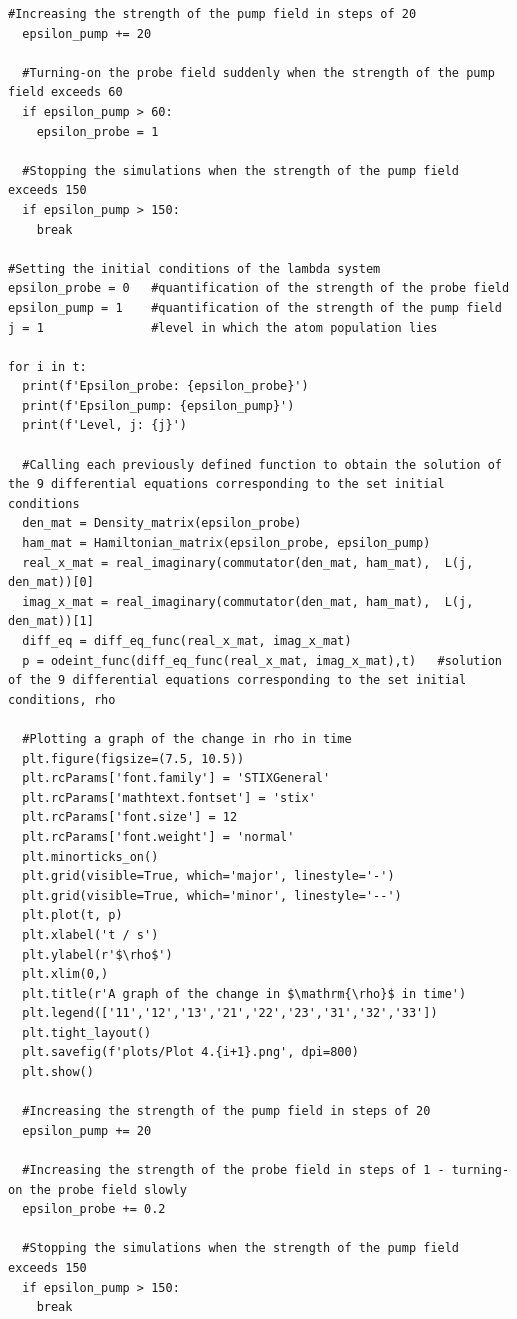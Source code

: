 \documentclass[12pt, a4paper]{article}
\begin{document}
\begin{lstlisting}[language=iPython]
  #Increasing the strength of the pump field in steps of 20
  epsilon_pump += 20

  #Turning-on the probe field suddenly when the strength of the pump field exceeds 60
  if epsilon_pump > 60:
    epsilon_probe = 1

  #Stopping the simulations when the strength of the pump field exceeds 150
  if epsilon_pump > 150:
    break

#Setting the initial conditions of the lambda system
epsilon_probe = 0   #quantification of the strength of the probe field
epsilon_pump = 1    #quantification of the strength of the pump field
j = 1               #level in which the atom population lies

for i in t:
  print(f'Epsilon_probe: {epsilon_probe}')
  print(f'Epsilon_pump: {epsilon_pump}')
  print(f'Level, j: {j}')

  #Calling each previously defined function to obtain the solution of the 9 differential equations corresponding to the set initial conditions
  den_mat = Density_matrix(epsilon_probe)
  ham_mat = Hamiltonian_matrix(epsilon_probe, epsilon_pump)
  real_x_mat = real_imaginary(commutator(den_mat, ham_mat),  L(j, den_mat))[0]
  imag_x_mat = real_imaginary(commutator(den_mat, ham_mat),  L(j, den_mat))[1]
  diff_eq = diff_eq_func(real_x_mat, imag_x_mat)
  p = odeint_func(diff_eq_func(real_x_mat, imag_x_mat),t)   #solution of the 9 differential equations corresponding to the set initial conditions, rho

  #Plotting a graph of the change in rho in time
  plt.figure(figsize=(7.5, 10.5))
  plt.rcParams['font.family'] = 'STIXGeneral'
  plt.rcParams['mathtext.fontset'] = 'stix'
  plt.rcParams['font.size'] = 12
  plt.rcParams['font.weight'] = 'normal'
  plt.minorticks_on()
  plt.grid(visible=True, which='major', linestyle='-')
  plt.grid(visible=True, which='minor', linestyle='--')
  plt.plot(t, p)
  plt.xlabel('t / s')
  plt.ylabel(r'$\rho$')
  plt.xlim(0,)
  plt.title(r'A graph of the change in $\mathrm{\rho}$ in time')
  plt.legend(['11','12','13','21','22','23','31','32','33'])
  plt.tight_layout()
  plt.savefig(f'plots/Plot 4.{i+1}.png', dpi=800)
  plt.show()

  #Increasing the strength of the pump field in steps of 20
  epsilon_pump += 20

  #Increasing the strength of the probe field in steps of 1 - turning-on the probe field slowly
  epsilon_probe += 0.2

  #Stopping the simulations when the strength of the pump field exceeds 150
  if epsilon_pump > 150:
    break
\end{lstlisting}
\end{document}
